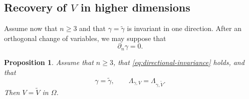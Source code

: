 \documentclass[a4paper,12pt]{article}
\newcommand{\pr}{\partial}
\newtheorem{prop}[thm]{Proposition}
\theoremstyle{definition}
\theoremstyle{remark}
\begin{document}
\subsection{Recovery of $V$ in higher dimensions}

Assume now that $n\ge 3$ and that $\gamma=\tilde\gamma$ is invariant in one direction. After an orthogonal change of variables, we may suppose that
\begin{equation}\label{eq:directional-invariance}
\pr_n\gamma=0.
\end{equation}

\begin{prop}\label{prop:recover-V-nd}
Assume that $n\ge 3$, that \eqref{eq:directional-invariance} holds, and that
\[
\gamma=\tilde\gamma,
\qquad
\Lambda_{\gamma,V}=\Lambda_{\gamma,\tilde V}.
\]
Then $V=\tilde V$ in $\Omega$.
\end{prop}
\end{document}
